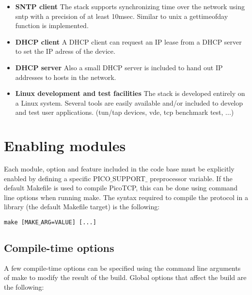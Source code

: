 \begin{itemize}
\item \textbf{SNTP client} The stack supports synchronizing time over the network using sntp with a precision of at least 10msec. Similar to unix a gettimeofday function is implemented.
\item \textbf{DHCP client} A DHCP client can request an IP lease from a DHCP server to set the IP
					adress of the device.
\item \textbf{DHCP server} Also a small DHCP server is included to hand out IP addresses to hosts
					in the network.
\item \textbf{Linux development and test facilities} The stack is developed entirely on a Linux system.
					Several tools are easily available and/or included to develop and test user applications.
					(tun/tap devices, vde, tcp benchmark test, ...)
\end{itemize}

\section{Enabling modules}
Each module, option and feature included in the code base must be explicitly
enabled by defining a specific PICO$\_$SUPPORT$\_$ preprocessor variable.
If the default Makefile is used to compile PicoTCP, this can be done using
command line options when running make. The syntax required to compile the
protocol in a library (the default Makefile target) is the following:

\texttt{make [MAKE$\_$ARG=VALUE] [...] }

\subsection{Compile-time options}
A few compile-time options can be specified using the command line
arguments of make to modify the result of the build. Global options that
affect the build are the following:

